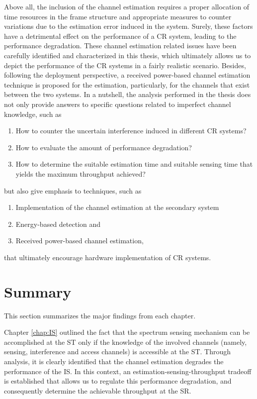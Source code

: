 Above all, the inclusion of the channel estimation requires a proper allocation of time resources in the frame structure and appropriate measures to counter variations due to the estimation error induced in the system. Surely, these factors have a detrimental effect on the performance of a CR system, leading to the performance degradation. These channel estimation related issues have been carefully identified and characterized in this thesis, which ultimately allows us to depict the performance of the CR systems in a fairly realistic scenario. Besides, following the deployment perspective, a received power-based channel estimation technique is proposed for the estimation, particularly, for the channels that exist between the two systems. In a nutshell, the analysis performed in the thesis does not only provide answers to specific questions related to imperfect channel knowledge, such as 
\begin{enumerate} \item How to counter the uncertain interference induced in different CR systems? \item How to evaluate the amount of performance degradation? \item How to determine the suitable estimation time and suitable sensing time that yields the maximum throughput achieved? \end{enumerate}
but also give emphasis to techniques, such as \begin{enumerate} \item Implementation of the channel estimation at the secondary system \item Energy-based detection and \item Received power-based channel estimation, \end{enumerate} that ultimately encourage hardware implementation of CR systems. 


\section{Summary}
This section summarizes the major findings from each chapter. 

Chapter \ref{chap:IS} outlined the fact that the spectrum sensing mechanism can be accomplished at the ST only if the knowledge of the involved channels (namely, sensing, interference and access channels) is accessible at the ST. Through analysis, it is clearly identified that the channel estimation degrades the performance of the IS. In this context, an estimation-sensing-throughput tradeoff is established that allows us to regulate this performance degradation, and consequently determine the achievable throughput at the SR.

